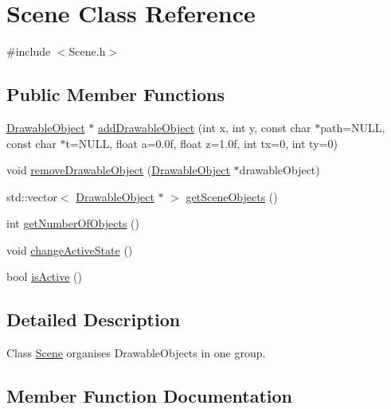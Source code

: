 \hypertarget{classScene}{}\section{Scene Class Reference}
\label{classScene}


{\ttfamily \#include $<$Scene.\+h$>$}

\subsection*{Public Member Functions}
\begin{DoxyCompactItemize}
\item 
\hyperlink{classDrawableObject}{Drawable\+Object} $\ast$ \hyperlink{classScene_a962104754fdb9efc987b339ac124f0bd}{add\+Drawable\+Object} (int x, int y, const char $\ast$path=N\+U\+LL, const char $\ast$t=N\+U\+LL, float a=0.\+0f, float z=1.\+0f, int tx=0, int ty=0)
\item 
void \hyperlink{classScene_aba5ad7d8c23cb1afd4307d2cc16eb1db}{remove\+Drawable\+Object} (\hyperlink{classDrawableObject}{Drawable\+Object} $\ast$drawable\+Object)
\item 
std\+::vector$<$ \hyperlink{classDrawableObject}{Drawable\+Object} $\ast$ $>$ \hyperlink{classScene_a30cb2b4641a02432e962e6961b354318}{get\+Scene\+Objects} ()
\item 
int \hyperlink{classScene_a9764f41b417bf1f2ea4bb752b23ef1c5}{get\+Number\+Of\+Objects} ()
\item 
void \hyperlink{classScene_a27d5e7909f21726279092d722e095c57}{change\+Active\+State} ()
\item 
bool \hyperlink{classScene_aac02dec89aa4d67ea4187b9decf4f772}{is\+Active} ()
\end{DoxyCompactItemize}


\subsection{Detailed Description}
Class \hyperlink{classScene}{Scene} organises Drawable\+Objects in one group. 

\subsection{Member Function Documentation}
